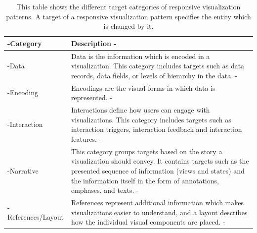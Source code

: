 \begin{table}[tp]
\tablestretch
{}
\centering
\begin{tabularx}{\linewidth}{>{\kern-\tabcolsep}lX<{\kern-\tabcolsep}}
\toprule
Category & Description \\
\midrule
Data & Data is the information which is encoded in a visualization. This category includes targets such as data records, data fields, or levels of hierarchy in the data. \\
Encoding & Encodings are the visual forms in which data is represented. \\
Interaction & Interactions define how users can engage with visualizations. This category includes targets such as interaction triggers, interaction feedback and interaction features. \\
Narrative & This category groups targets based on the story a visualization should convey. It contains targets such as the presented sequence of information (views and states) and the information itself in the form of annotations, emphases, and texts. \\
References/Layout & References represent additional information which makes visualizations easier to understand, and a layout describes how the individual visual components are placed. \\
\bottomrule
\end{tabularx}
\caption[Targets of Responsive Visualization Patterns]{
  This table shows the different target categories of responsive visualization patterns. 
  A target of a responsive visualization pattern specifies the entity which is changed by it.
}
\label{tab:PatternsTargets}
\end{table}

